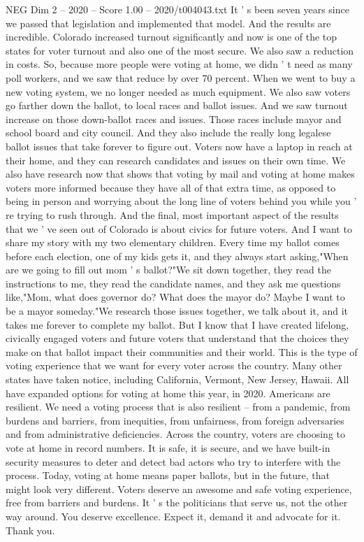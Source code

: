 \begin{textsample}{NEG Dim 2 – 2020 – Score 1.00 – 2020/t004043.txt}
It ' s been seven years since we passed that legislation and implemented that model.
And the results are incredible.
Colorado increased turnout significantly and now is one of the top states for voter turnout and also one of the most secure.
We also saw a reduction in costs.
So, because more people were voting at home, we didn ' t need as many poll workers, and we saw that reduce by over 70 percent.
When we went to buy a new voting system, we no longer needed as much equipment.
We also saw voters go farther down the ballot, to local races and ballot issues.
And we saw turnout increase on those down-ballot races and issues.
Those races include mayor and school board and city council.
And they also include the really long legalese ballot issues that take forever to figure out.
Voters now have a laptop in reach at their home, and they can research candidates and issues on their own time.
We also have research now that shows that voting by mail and voting at home makes voters more informed because they have all of that extra time, as opposed to being in person and worrying about the long line of voters behind you while you ' re trying to rush through.
And the final, most important aspect of the results that we ' ve seen out of Colorado is about civics for future voters.
And I want to share my story with my two elementary children.
Every time my ballot comes before each election, one of my kids gets it, and they always start asking,"When are we going to fill out mom ' s ballot?"We sit down together, they read the instructions to me, they read the candidate names, and they ask me questions like,"Mom, what does governor do?
What does the mayor do?
Maybe I want to be a mayor someday."We research those issues together, we talk about it, and it takes me forever to complete my ballot.
But I know that I have created lifelong, civically engaged voters and future voters that understand that the choices they make on that ballot impact their communities and their world.
This is the type of voting experience that we want for every voter across the country.
Many other states have taken notice, including California, Vermont, New Jersey, Hawaii.
All have expanded options for voting at home this year, in 2020.
Americans are resilient.
We need a voting process that is also resilient -- from a pandemic, from burdens and barriers, from inequities, from unfairness, from foreign adversaries and from administrative deficiencies.
Across the country, voters are choosing to vote at home in record numbers.
It is safe, it is secure, and we have built-in security measures to deter and detect bad actors who try to interfere with the process.
Today, voting at home means paper ballots, but in the future, that might look very different.
Voters deserve an awesome and safe voting experience, free from barriers and burdens.
It ' s the politicians that serve us, not the other way around.
You deserve excellence.
Expect it, demand it and advocate for it.
Thank you.

\end{textsample}
